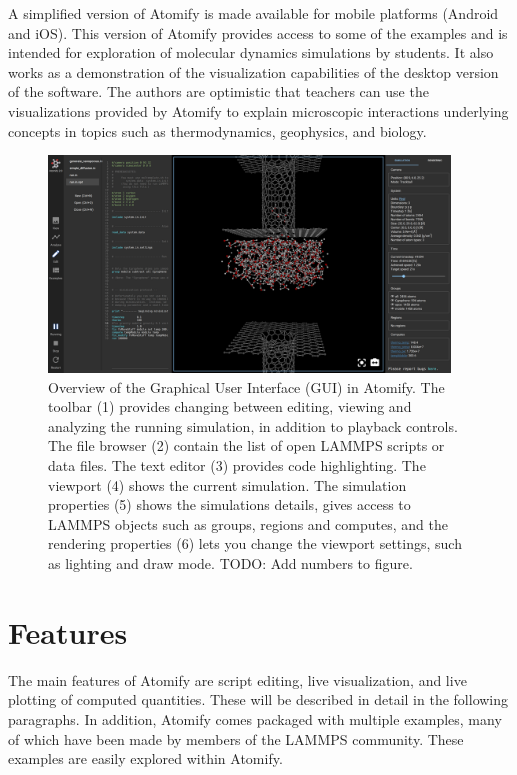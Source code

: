 \documentclass[aps,pre,twocolumn,letterpaper,floatfix,nofootinbib]{revtex4}
\begin{document}
A simplified version of Atomify is made available for mobile platforms (Android
and iOS).
This version of Atomify provides access to some of the examples and is intended
for exploration of molecular dynamics simulations by students.
It also works as a demonstration of the visualization capabilities of the
desktop version of the software.
The authors are optimistic that teachers can use the visualizations provided by
Atomify to explain microscopic interactions underlying concepts in topics such
as thermodynamics, geophysics, and biology.
\begin{figure}
	\centering
	\includegraphics[width=0.95\textwidth]{gui.png}
	\caption{%
    Overview of the Graphical User Interface (GUI) in Atomify.
    The toolbar (1) provides changing
    between editing, viewing and analyzing the running simulation,
    in addition to playback controls.
    The file browser (2) contain the list of open LAMMPS scripts or data files.
    The text editor (3) provides code highlighting.
    The viewport (4) shows the current simulation.
    The simulation properties (5) shows the simulations details, gives access to 
    LAMMPS objects such as groups, regions and computes, and the rendering
    properties (6) lets you change the viewport settings, such as lighting and
    draw mode.
    TODO: Add numbers to figure.
    }
	\label{fig:gui}
\end{figure}
\section{Features}

The main features of Atomify are script editing,
live visualization, and live plotting of computed quantities.
These will be described in detail in the following paragraphs.
In addition, Atomify comes packaged with multiple examples,
many of which have been made by members of the LAMMPS community.
These examples are easily explored within Atomify.
\end{document}
